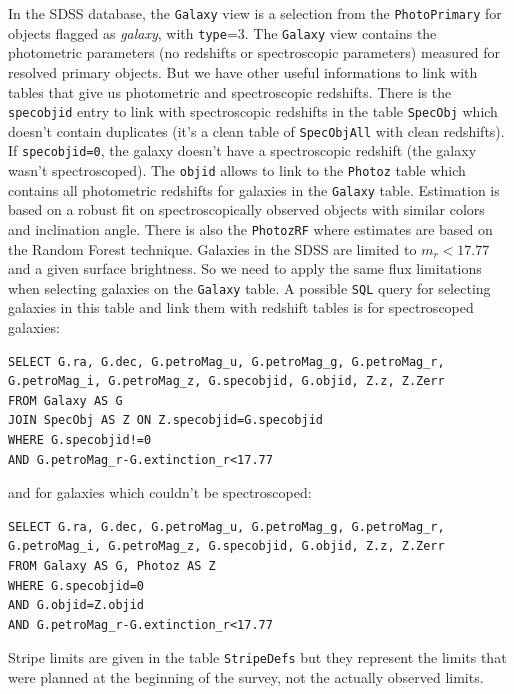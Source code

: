 In the SDSS database, the \texttt{Galaxy} view is a selection from the
\texttt{PhotoPrimary} for objects flagged as \emph{galaxy}, with
\texttt{type}=3. The \texttt{Galaxy} view contains the photometric parameters
(no redshifts or spectroscopic parameters) measured for resolved primary
objects. But we have other useful informations to link with tables that give us
photometric and spectroscopic redshifts. There is the \texttt{specobjid} entry
to link with spectroscopic redshifts in the table \texttt{SpecObj} which
doesn't contain duplicates (it's a clean table of \texttt{SpecObjAll} with
clean redshifts). If \texttt{specobjid=0}, the galaxy doesn't have a
spectroscopic redshift (the galaxy wasn't spectroscoped). The \texttt{objid}
allows to link to the \texttt{Photoz} table which contains all photometric
redshifts for galaxies in the \texttt{Galaxy} table. Estimation is based on a
robust fit on spectroscopically observed objects with similar colors and
inclination angle. There is also the \texttt{PhotozRF} where estimates are
based on the Random Forest technique. Galaxies in the SDSS are limited to
$m_r<17.77$ and a given surface brightness. So we need to apply the same flux
limitations when selecting galaxies on the \texttt{Galaxy} table. A possible
\texttt{SQL} query for selecting galaxies in this table and link them with
redshift tables is for spectroscoped galaxies:
%
\begin{listing}[H]
    \begin{verbatim}
SELECT G.ra, G.dec, G.petroMag_u, G.petroMag_g, G.petroMag_r,
G.petroMag_i, G.petroMag_z, G.specobjid, G.objid, Z.z, Z.Zerr
FROM Galaxy AS G
JOIN SpecObj AS Z ON Z.specobjid=G.specobjid
WHERE G.specobjid!=0
AND G.petroMag_r-G.extinction_r<17.77
    \end{verbatim}
\end{listing}
%
and for galaxies which couldn't be spectroscoped:
%
\begin{listing}[H]
    \begin{verbatim}
SELECT G.ra, G.dec, G.petroMag_u, G.petroMag_g, G.petroMag_r,
G.petroMag_i, G.petroMag_z, G.specobjid, G.objid, Z.z, Z.Zerr
FROM Galaxy AS G, Photoz AS Z
WHERE G.specobjid=0
AND G.objid=Z.objid
AND G.petroMag_r-G.extinction_r<17.77
    \end{verbatim}
\end{listing}

Stripe limits are given in the table \texttt{StripeDefs} but they represent
the limits that were planned at the beginning of the survey, not the actually
observed limits.

